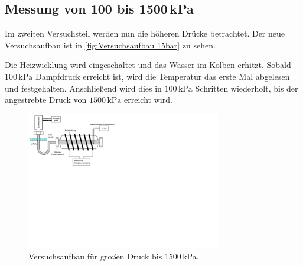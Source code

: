 \subsection{Messung von 100 bis 1500\,kPa}
\label{sec:Messung von 1 bis 15 Bar}

Im zweiten Versuchsteil werden nun die höheren Drücke betrachtet.
Der neue Versuchsaufbau ist in \autoref{fig:Versuchsaufbau 15bar} zu sehen.

Die Heizwicklung wird eingeschaltet und das Wasser im Kolben erhitzt.
Sobald $100\,\unit{\kilo\pascal}$ Dampfdruck erreicht ist, wird die Temperatur das erste Mal abgelesen und festgehalten.
Anschließend wird dies in $100\,\unit{\kilo\pascal}$ Schritten wiederholt, bis der angestrebte Druck
von $1500\,\unit{\kilo\pascal}$ erreicht wird.

\begin{figure} [H]
    \centering
    \includegraphics[height=6cm]{content/Bilder/Versuchsaufbau_15bar.pdf}
    \caption{Versuchsaufbau für großen Druck bis 1500\,kPa. \cite{v203}}
    \label{fig:Versuchsaufbau 15bar}
\end{figure}